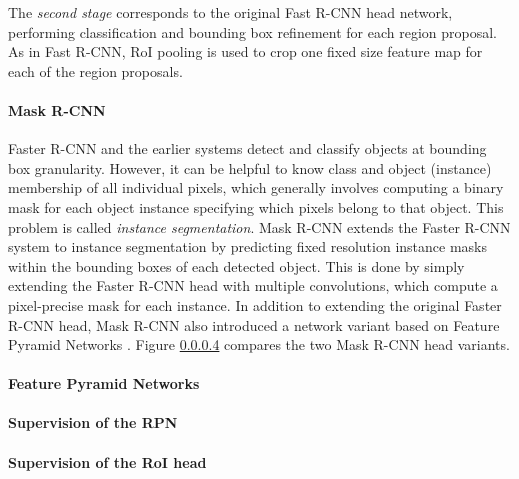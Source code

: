 The \emph{second stage} corresponds to the original Fast R-CNN head network, performing classification
and bounding box refinement for each region proposal. %
As in Fast R-CNN, RoI pooling is used to crop one fixed size feature map for each of the region proposals.

\paragraph{Mask R-CNN}
Faster R-CNN and the earlier systems detect and classify objects at bounding box granularity.
However, it can be helpful to know class and object (instance) membership of all individual pixels,
which generally involves computing a binary mask for each object instance specifying which pixels belong
to that object. This problem is called \emph{instance segmentation}.
Mask R-CNN \cite{MaskRCNN} extends the Faster R-CNN system to instance segmentation by predicting
fixed resolution instance masks within the bounding boxes of each detected object.
This is done by simply extending the Faster R-CNN head with multiple convolutions, which
compute a pixel-precise mask for each instance.
In addition to extending the original Faster R-CNN head, Mask R-CNN also introduced a network
variant based on Feature Pyramid Networks \cite{FPN}.
Figure \ref{} compares the two Mask R-CNN head variants.

\paragraph{Feature Pyramid Networks}

\paragraph{Supervision of the RPN}
\paragraph{Supervision of the RoI head}

